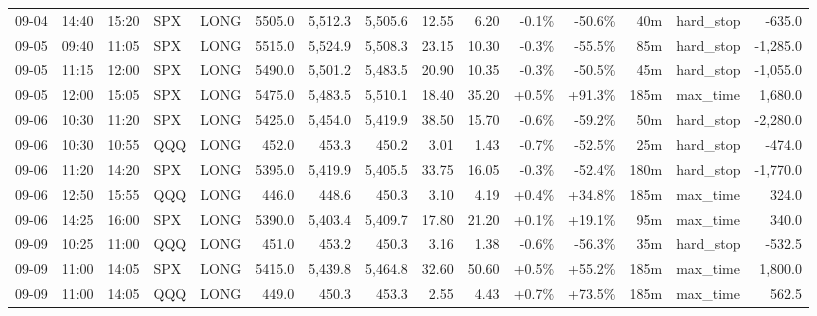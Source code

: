 \documentclass[11pt,a4paper,twoside]{article}
\begin{document}
\begin{landscape}
\begin{center}
\begin{longtable}{>{\color{txtmain}}l l l l l r r r r r r r r >{\color{txtmain}}l r}
09-04 & 14:40 & 15:20 & SPX & LONG & 5505.0 & 5,512.3 & 5,505.6 & 12.55 & 6.20 & \textcolor{lossred}{-0.1\%} & \textcolor{lossred}{-50.6\%} & 40m & hard\_stop & \textcolor{lossred}{-635.0} \\
09-05 & 09:40 & 11:05 & SPX & LONG & 5515.0 & 5,524.9 & 5,508.3 & 23.15 & 10.30 & \textcolor{lossred}{-0.3\%} & \textcolor{lossred}{-55.5\%} & 85m & hard\_stop & \textcolor{lossred}{-1,285.0} \\
09-05 & 11:15 & 12:00 & SPX & LONG & 5490.0 & 5,501.2 & 5,483.5 & 20.90 & 10.35 & \textcolor{lossred}{-0.3\%} & \textcolor{lossred}{-50.5\%} & 45m & hard\_stop & \textcolor{lossred}{-1,055.0} \\
09-05 & 12:00 & 15:05 & SPX & LONG & 5475.0 & 5,483.5 & 5,510.1 & 18.40 & 35.20 & \textcolor{wingreen}{+0.5\%} & \textcolor{wingreen}{+91.3\%} & 185m & max\_time & \textcolor{wingreen}{1,680.0} \\
09-06 & 10:30 & 11:20 & SPX & LONG & 5425.0 & 5,454.0 & 5,419.9 & 38.50 & 15.70 & \textcolor{lossred}{-0.6\%} & \textcolor{lossred}{-59.2\%} & 50m & hard\_stop & \textcolor{lossred}{-2,280.0} \\
09-06 & 10:30 & 10:55 & QQQ & LONG & 452.0 & 453.3 & 450.2 & 3.01 & 1.43 & \textcolor{lossred}{-0.7\%} & \textcolor{lossred}{-52.5\%} & 25m & hard\_stop & \textcolor{lossred}{-474.0} \\
09-06 & 11:20 & 14:20 & SPX & LONG & 5395.0 & 5,419.9 & 5,405.5 & 33.75 & 16.05 & \textcolor{lossred}{-0.3\%} & \textcolor{lossred}{-52.4\%} & 180m & hard\_stop & \textcolor{lossred}{-1,770.0} \\
09-06 & 12:50 & 15:55 & QQQ & LONG & 446.0 & 448.6 & 450.3 & 3.10 & 4.19 & \textcolor{wingreen}{+0.4\%} & \textcolor{wingreen}{+34.8\%} & 185m & max\_time & \textcolor{wingreen}{324.0} \\
09-06 & 14:25 & 16:00 & SPX & LONG & 5390.0 & 5,403.4 & 5,409.7 & 17.80 & 21.20 & \textcolor{wingreen}{+0.1\%} & \textcolor{wingreen}{+19.1\%} & 95m & max\_time & \textcolor{wingreen}{340.0} \\
09-09 & 10:25 & 11:00 & QQQ & LONG & 451.0 & 453.2 & 450.3 & 3.16 & 1.38 & \textcolor{lossred}{-0.6\%} & \textcolor{lossred}{-56.3\%} & 35m & hard\_stop & \textcolor{lossred}{-532.5} \\
09-09 & 11:00 & 14:05 & SPX & LONG & 5415.0 & 5,439.8 & 5,464.8 & 32.60 & 50.60 & \textcolor{wingreen}{+0.5\%} & \textcolor{wingreen}{+55.2\%} & 185m & max\_time & \textcolor{wingreen}{1,800.0} \\
09-09 & 11:00 & 14:05 & QQQ & LONG & 449.0 & 450.3 & 453.3 & 2.55 & 4.43 & \textcolor{wingreen}{+0.7\%} & \textcolor{wingreen}{+73.5\%} & 185m & max\_time & \textcolor{wingreen}{562.5} \\

\end{longtable}
\end{center}
\end{landscape}
\end{document}
